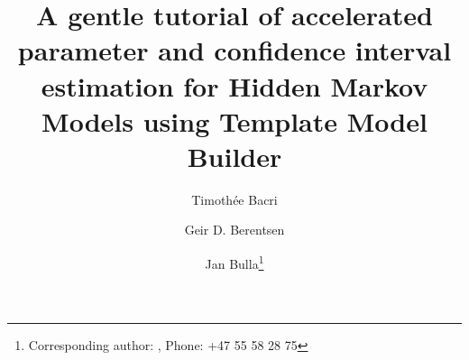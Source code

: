 \documentclass[bimj,fleqn]{w-art}\usepackage[]{graphicx}\usepackage[]{color}
\theoremstyle{plain}
\theoremstyle{definition}
\begin{document}
              








\title[Tutorial of parameter and confidence interval estimation for HMMs using {\tt TMB}]{A gentle tutorial of accelerated parameter and confidence interval estimation for Hidden Markov Models using Template Model Builder}
\author[Bacri {\it{et al.}}]{Timoth\'ee Bacri}
\address[\inst{1}]{Department of Statistics, University of Bergen, 5007 Bergen, Norway}
\author[]{Geir D. Berentsen}
\address[\inst{2}]{Department of Business and Management Science, Norwegian School of Economics, Helleveien 30, 5045 Bergen, Norway}
\author[]{Jan Bulla\footnote{Corresponding author: {}, Phone: +47 55 58 28 75}}
  
\end{document}

